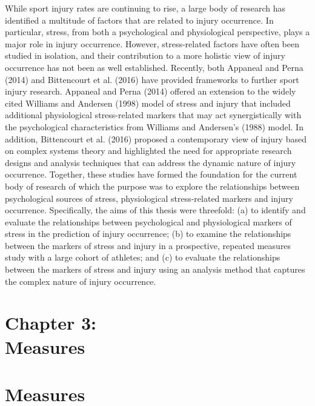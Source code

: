 \documentclass[man,floatsintext]{apa6}
\begin{document}
While sport injury rates are continuing to rise, a large body of research has identified a multitude of factors that are related to injury occurrence.
In particular, stress, from both a psychological and physiological perspective, plays a major role in injury occurrence.
However, stress-related factors have often been studied in isolation, and their contribution to a more holistic view of injury occurrence has not been as well established.
Recently, both Appaneal and Perna (2014) and Bittencourt et al. (2016) have provided frameworks to further sport injury research.
Appaneal and Perna (2014) offered an extension to the widely cited Williams and Andersen (1998) model of stress and injury that included additional physiological stress-related markers that may act synergistically with the psychological characteristics from Williams and Andersen's (1988) model.
In addition, Bittencourt et al. (2016) proposed a contemporary view of injury based on complex systems theory and highlighted the need for appropriate research designs and analysis techniques that can address the dynamic nature of injury occurrence.
Together, these studies have formed the foundation for the current body of research of which the purpose was to explore the relationships between psychological sources of stress, physiological stress-related markers and injury occurrence.
Specifically, the aims of this thesis were threefold:
(a) to identify and evaluate the relationships between psychological and physiological markers of stress in the prediction of injury occurrence;
(b) to examine the relationships between the markers of stress and injury in a prospective, repeated measures study with a large cohort of athletes; and
(c) to evaluate the relationships between the markers of stress and injury using an analysis method that captures the complex nature of injury occurrence.

\clearpage

\vspace*{3cm}

\section[Chapter 3: Measures]{\Large{Chapter 3: \\ Measures}}

\clearpage

\hypertarget{measures}{%
\section{Measures}\label{measures}}
\end{document}
